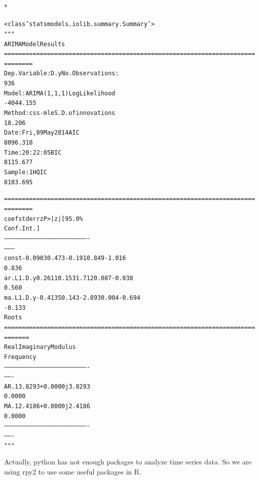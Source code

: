 \documentclass[letterpaper,10pt,english]{/Users/edwsurewin/anaconda/lib/python2.7/site-packages/sphinx/texinputs/sphinxhowto}
\def\smaller{\fontsize{9.5pt}{9.5pt}\selectfont}
\newenvironment{InvisibleVerbatim}
        {\begin{mdframed}[leftmargin=0.1\linewidth,innerleftmargin=3pt,innerrightmargin=3pt, userdefinedwidth=1\linewidth, linewidth=0pt, linecolor=white, usetwoside=false]}
        {\end{mdframed}}
\begin{document}
                \makebox[0.1\linewidth]{\smaller\hfill\tt\color{nbframe-out-prompt}Out\hspace{4pt}{[}7{]}:\hspace{4pt}}\\*
                \vspace{-2.55\baselineskip}\begin{InvisibleVerbatim}
                \vspace{-0.5\baselineskip}
\begin{alltt}<class 'statsmodels.iolib.summary.Summary'>
"""
                             ARIMA Model Results
======================================================================
========
Dep. Variable:                    D.y   No. Observations:
936
Model:                 ARIMA(1, 1, 1)   Log Likelihood
-4044.155
Method:                       css-mle   S.D. of innovations
18.206
Date:                Fri, 09 May 2014   AIC
8096.310
Time:                        20:22:05   BIC
8115.677
Sample:                             1   HQIC
8103.695

======================================================================
========
                 coef    std err          z      P>|z|      [95.0\%
Conf. Int.]
----------------------------------------------------------------------
--------
const         -0.0903      0.473     -0.191      0.849        -1.016
0.836
ar.L1.D.y      0.2611      0.153      1.712      0.087        -0.038
0.560
ma.L1.D.y     -0.4135      0.143     -2.893      0.004        -0.694
-0.133
                                    Roots
======================================================================
=======
                 Real           Imaginary           Modulus
Frequency
----------------------------------------------------------------------
-------
AR.1            3.8293           +0.0000j            3.8293
0.0000
MA.1            2.4186           +0.0000j            2.4186
0.0000
----------------------------------------------------------------------
-------
"""\end{alltt}

            \end{InvisibleVerbatim}
            
        
    
Actually, python has not enough packages to analyze time series data. So
we are using rpy2 to use some useful packages in R.

\iffalse

\end{document}
